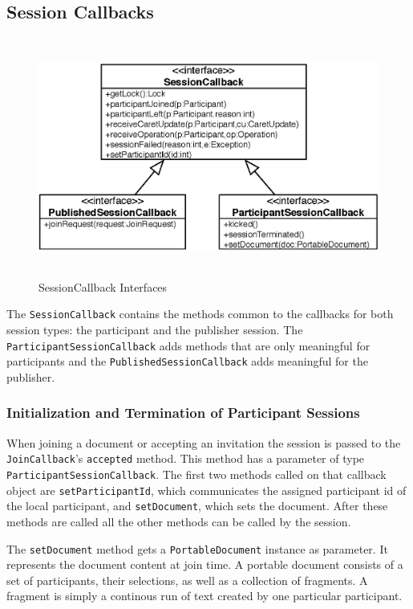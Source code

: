 \subsection{Session Callbacks}
\begin{figure}[H]
 \centering
 \includegraphics[width=14.25cm,height=7.83cm]{../images/finalreport/architecture_sessioncallback_uml.eps}
 \caption{SessionCallback Interfaces}
 \label{fig:archoverview.sessioncallback}
\end{figure}

The \texttt{Session\-Callback} contains the methods common to the callbacks for 
both session types: the participant and the publisher session. The 
\texttt{Participant\-Session\-Callback} adds methods that are only meaningful 
for participants and the \texttt{Published\-Session\-Callback} adds meaningful
for the publisher.


\subsubsection{Initialization and Termination of Participant Sessions}
When joining a document or accepting an invitation the session is passed to
the \texttt{Join\-Callback}'s \texttt{accepted} method. This method has a
parameter of type \texttt{Participant\-Session\-Callback}. The first two
methods called on that callback object are \texttt{set\-Participant\-Id}, which 
communicates the assigned participant id of the local participant, and 
\texttt{set\-Document}, which sets the document. After these methods are called
all the other methods can be called by the session.

The \texttt{set\-Document} method gets a \texttt{Portable\-Document} instance
as parameter. It represents the document content at join time. A portable
document consists of a set of participants, their selections, as well as
a collection of fragments. A fragment is simply a continous run of text
created by one particular participant.

